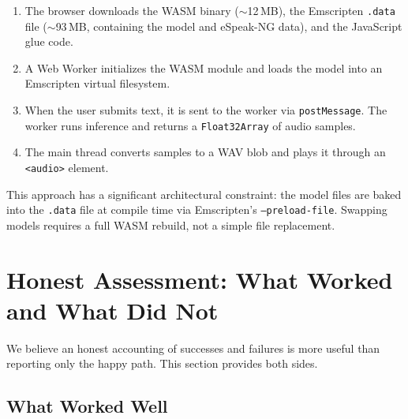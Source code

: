 \documentclass[10pt,a4paper,twocolumn]{article}
\begin{document}
\begin{enumerate}[nosep]
    \item The browser downloads the WASM binary ($\sim$12\,MB), the Emscripten \texttt{.data} file ($\sim$93\,MB, containing the model and eSpeak-NG data), and the JavaScript glue code.
    \item A Web Worker initializes the WASM module and loads the model into an Emscripten virtual filesystem.
    \item When the user submits text, it is sent to the worker via \texttt{postMessage}. The worker runs inference and returns a \texttt{Float32Array} of audio samples.
    \item The main thread converts samples to a WAV blob and plays it through an \texttt{<audio>} element.
\end{enumerate}

This approach has a significant architectural constraint: the model files are baked into the \texttt{.data} file at compile time via Emscripten's \texttt{--preload-file}. Swapping models requires a full WASM rebuild, not a simple file replacement.

\section{Honest Assessment: What Worked and What Did Not}
\label{sec:assessment}

We believe an honest accounting of successes and failures is more useful than reporting only the happy path. This section provides both sides.

\subsection{What Worked Well}
\end{document}

